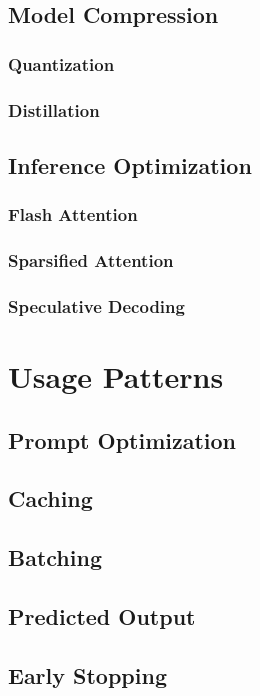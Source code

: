 \subsection{Model Compression}

\subsubsection{Quantization}
\subsubsection{Distillation}

\subsection{Inference Optimization}

\subsubsection{Flash Attention}
\subsubsection{Sparsified Attention}
\subsubsection{Speculative Decoding}

\section{Usage Patterns}

\subsection{Prompt Optimization}
\subsection{Caching}
\subsection{Batching}
\subsection{Predicted Output}
\subsection{Early Stopping}

